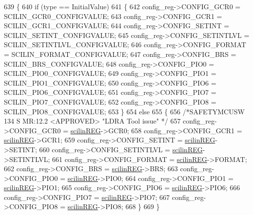 \begin{DoxyCode}
639 \{
640     \textcolor{keywordflow}{if} (type == InitialValue)
641     \{
642         config\_reg->CONFIG\_GCR0      = SCILIN\_GCR0\_CONFIGVALUE;
643         config\_reg->CONFIG\_GCR1      = SCILIN\_GCR1\_CONFIGVALUE;
644         config\_reg->CONFIG\_SETINT    = SCILIN\_SETINT\_CONFIGVALUE;
645         config\_reg->CONFIG\_SETINTLVL = SCILIN\_SETINTLVL\_CONFIGVALUE;
646         config\_reg->CONFIG\_FORMAT    = SCILIN\_FORMAT\_CONFIGVALUE;
647         config\_reg->CONFIG\_BRS       = SCILIN\_BRS\_CONFIGVALUE;
648         config\_reg->CONFIG\_PIO0      = SCILIN\_PIO0\_CONFIGVALUE;
649         config\_reg->CONFIG\_PIO1      = SCILIN\_PIO1\_CONFIGVALUE;
650         config\_reg->CONFIG\_PIO6      = SCILIN\_PIO6\_CONFIGVALUE;
651         config\_reg->CONFIG\_PIO7      = SCILIN\_PIO7\_CONFIGVALUE;
652         config\_reg->CONFIG\_PIO8      = SCILIN\_PIO8\_CONFIGVALUE; 
653     \}
654     \textcolor{keywordflow}{else}
655     \{
656     \textcolor{comment}{/*SAFETYMCUSW 134 S MR:12.2 <APPROVED> "LDRA Tool issue" */}
657         config\_reg->CONFIG\_GCR0      = \mbox{\hyperlink{reg__sci_8h_a389eea3394ad09b70e9d400b120186b4}{scilinREG}}->GCR0;
658         config\_reg->CONFIG\_GCR1      = \mbox{\hyperlink{reg__sci_8h_a389eea3394ad09b70e9d400b120186b4}{scilinREG}}->GCR1; 
659         config\_reg->CONFIG\_SETINT    = \mbox{\hyperlink{reg__sci_8h_a389eea3394ad09b70e9d400b120186b4}{scilinREG}}->SETINT; 
660         config\_reg->CONFIG\_SETINTLVL = \mbox{\hyperlink{reg__sci_8h_a389eea3394ad09b70e9d400b120186b4}{scilinREG}}->SETINTLVL; 
661         config\_reg->CONFIG\_FORMAT    = \mbox{\hyperlink{reg__sci_8h_a389eea3394ad09b70e9d400b120186b4}{scilinREG}}->FORMAT; 
662         config\_reg->CONFIG\_BRS       = \mbox{\hyperlink{reg__sci_8h_a389eea3394ad09b70e9d400b120186b4}{scilinREG}}->BRS; 
663         config\_reg->CONFIG\_PIO0      = \mbox{\hyperlink{reg__sci_8h_a389eea3394ad09b70e9d400b120186b4}{scilinREG}}->PIO0; 
664         config\_reg->CONFIG\_PIO1      = \mbox{\hyperlink{reg__sci_8h_a389eea3394ad09b70e9d400b120186b4}{scilinREG}}->PIO1; 
665         config\_reg->CONFIG\_PIO6      = \mbox{\hyperlink{reg__sci_8h_a389eea3394ad09b70e9d400b120186b4}{scilinREG}}->PIO6; 
666         config\_reg->CONFIG\_PIO7      = \mbox{\hyperlink{reg__sci_8h_a389eea3394ad09b70e9d400b120186b4}{scilinREG}}->PIO7;     
667         config\_reg->CONFIG\_PIO8      = \mbox{\hyperlink{reg__sci_8h_a389eea3394ad09b70e9d400b120186b4}{scilinREG}}->PIO8; 
668     \}
669 \}
\end{DoxyCode}
\mbox{\label{group__SCI_gac25800424a38ab1b3b0960f6b7cc4bc8}} 
